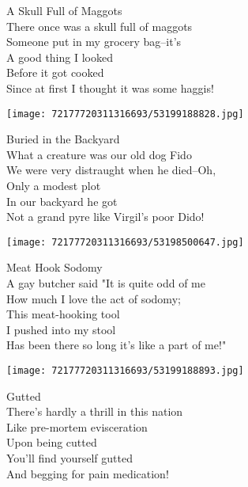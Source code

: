 \documentclass[10pt,letterpaper]{article}
\begin{document}
\begin{center}
A Skull Full of Maggots\\
\vskip 0.2in
There once was a skull full of maggots\\
Someone put in my grocery bag--it's\\
A good thing I looked\\
Before it got cooked\\
Since at first I thought it was some haggis!\\
\end{center}
\pagebreak

\begin{center}
\texttt{[image: 72177720311316693/53199188828.jpg]}
\end{center}

\begin{center}
Buried in the Backyard\\
\vskip 0.2in
What a creature was our old dog Fido\\
We were very distraught when he died--Oh,\\
Only a modest plot\\
In our backyard he got\\
Not a grand pyre like Virgil's poor Dido!\\
\end{center}
\pagebreak

\begin{center}
\texttt{[image: 72177720311316693/53198500647.jpg]}
\end{center}

\begin{center}
Meat Hook Sodomy\\
\vskip 0.2in
A gay butcher said "It is quite odd of me\\
How much I love the act of sodomy;\\
This meat-hooking tool\\
I pushed into my stool\\
Has been there so long it's like a part of me!"\\
\end{center}
\pagebreak

\begin{center}
\texttt{[image: 72177720311316693/53199188893.jpg]}
\end{center}

\begin{center}
Gutted\\
\vskip 0.2in
There's hardly a thrill in this nation\\
Like pre-mortem evisceration\\
Upon being cutted\\
You'll find yourself gutted\\
And begging for pain medication!\\
\end{center}
\pagebreak
\end{document}
